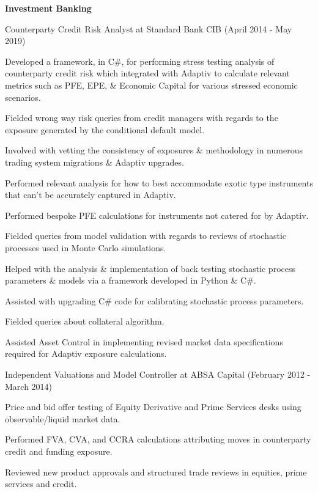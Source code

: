 \documentclass[11pt]{article}
\newenvironment{outerlist}[1][\enskip\textbullet]%
        {\begin{itemize}[#1]}{\end{itemize}%
         \vspace{-.6\baselineskip}}
\newenvironment{innerlist}[1][\enskip\textbullet]%
        {\begin{compactitem}[#1]}{\end{compactitem}}
\newcommand{\blankline}{\quad\pagebreak[2]}
\begin{document}
\textbf{Investment Banking}
%
\blankline
\begin{outerlist}
					\item[] Counterparty Credit Risk Analyst at Standard Bank CIB (April 2014 - May 2019)
					\begin{innerlist}
						\item Developed a framework, in C\#, for performing stress testing analysis of counterparty credit risk which integrated with Adaptiv to calculate relevant metrics such as PFE, EPE, \& Economic Capital for various stressed economic scenarios.
						\item Fielded wrong way risk queries from credit managers with regards to the exposure generated by the conditional default model.
						\item Involved with vetting the consistency of exposures \& methodology in numerous trading system migrations \& Adaptiv upgrades.
						\item Performed relevant analysis for how to best accommodate exotic type instruments that can't be accurately captured in Adaptiv.
						\item Performed bespoke PFE calculations for instruments not catered for by Adaptiv.
						\item Fielded queries from model validation with regards to reviews of stochastic processes used in Monte Carlo simulations.
						\item Helped with the analysis \& implementation of back testing stochastic process parameters \& models via a framework developed in Python \& C\#.
						\item Assisted with upgrading C\# code for calibrating stochastic process parameters. 
						\item Fielded queries about collateral algorithm.
						\item Assisted Asset Control in implementing revised market data specifications required for Adaptiv exposure calculations.
					\end{innerlist}
					\item[] Independent Valuations and Model Controller at ABSA Capital (February 2012 - March 2014)
					\begin{innerlist}
						\item Price and bid offer testing of Equity Derivative and Prime Services desks using observable/liquid market data.
						\item Performed FVA, CVA, and CCRA calculations attributing moves in counterparty credit and funding exposure. 
						\item Reviewed new product approvals and structured trade reviews in equities, prime services and credit. 

\end{innerlist}
\end{outerlist}
\end{document}

